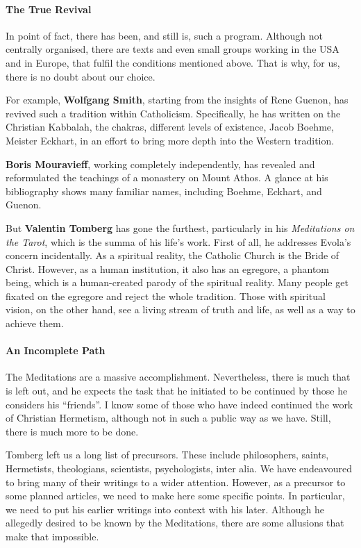 \paragraph{The True Revival}
In point of fact, there has been, and still is, such a program. Although not centrally organised, there are texts and
even small groups working in the USA and in Europe, that fulfil the conditions mentioned above. That is why, for us,
there is no doubt about our choice.

For example, \textbf{Wolfgang Smith}, starting from the insights of Rene Guenon, has revived such a tradition within
Catholicism. Specifically, he has written on the Christian Kabbalah, the chakras, different levels of existence, Jacob
Boehme, Meister Eckhart, in an effort to bring more depth into the Western tradition.

\textbf{Boris Mouravieff}, working completely independently, has revealed and reformulated the teachings of a monastery
on Mount Athos. A glance at his bibliography shows many familiar names, including Boehme, Eckhart, and Guenon.

But \textbf{Valentin Tomberg} has gone the furthest, particularly in his \emph{Meditations on the Tarot}, which is the
summa of his life's work. First of all, he addresses Evola's concern incidentally. As a
spiritual reality, the Catholic Church is the Bride of Christ. However, as a human institution, it also has an
egregore, a phantom being, which is a human-created parody of the spiritual reality. Many people get fixated on the
egregore and reject the whole tradition. Those with spiritual vision, on the other hand, see a living stream of truth
and life, as well as a way to achieve them.

\paragraph{An Incomplete Path}
The Meditations are a massive accomplishment. Nevertheless, there is much that is left out, and he expects the task that
he initiated to be continued by those he considers his “friends”. I know some of those who have indeed continued the
work of Christian Hermetism, although not in such a public way as we have. Still, there is much more to be done.

Tomberg left us a long list of precursors. These include philosophers, saints, Hermetists, theologians, scientists,
psychologists, inter alia. We have endeavoured to bring many of their writings to a wider attention. However, as a
precursor to some planned articles, we need to make here some specific points. In particular, we need to put his
earlier writings into context with his later. Although he allegedly desired to be known by the Meditations, there are
some allusions that make that impossible.

